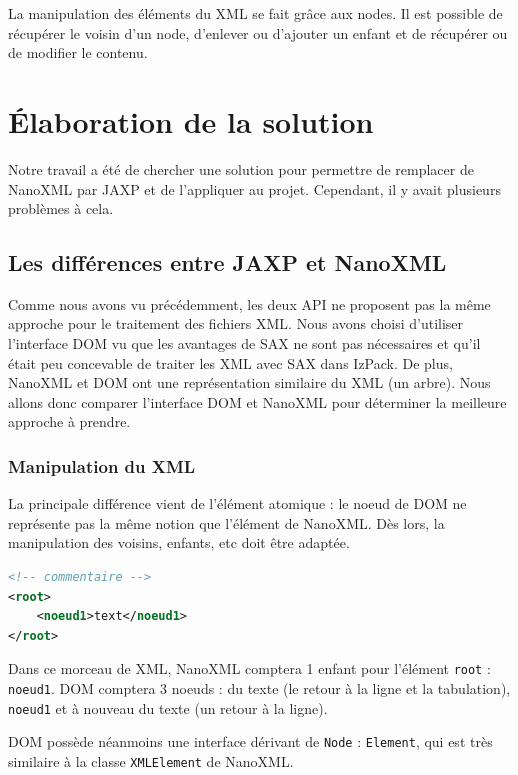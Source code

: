 La manipulation des éléments du XML se fait grâce aux nodes.
Il est possible de récupérer le voisin d'un node, d'enlever ou d'ajouter un enfant et de récupérer ou de modifier le contenu.
\section{Élaboration de la solution}
Notre travail a été de chercher une solution pour permettre de remplacer de NanoXML par JAXP et de l'appliquer au projet.
Cependant, il y avait plusieurs problèmes à cela.
\subsection{Les différences entre JAXP et NanoXML}
Comme nous avons vu précédemment, les deux API ne proposent pas la même approche pour le traitement des fichiers XML.
Nous avons choisi d'utiliser l'interface DOM vu que les avantages de SAX ne sont pas nécessaires et qu'il était peu concevable de traiter les XML avec SAX dans IzPack.
De plus, NanoXML et DOM ont une représentation similaire du XML (un arbre).
Nous allons donc comparer l'interface DOM et NanoXML pour déterminer la meilleure approche à prendre.
\subsubsection{Manipulation du XML}
La principale différence vient de l'élément atomique : le noeud de DOM ne représente pas la même notion que l'élément de NanoXML.
Dès lors, la manipulation des voisins, enfants, etc doit être adaptée.
\begin{lstlisting}[language=XML]
<!-- commentaire -->
<root>
	<noeud1>text</noeud1>
</root>
\end{lstlisting}
Dans ce morceau de XML, NanoXML comptera 1 enfant pour l'élément \verb|root| : \verb|noeud1|.
DOM comptera 3 noeuds : du texte (le retour à la ligne et la tabulation), \verb|noeud1| et à nouveau du texte (un retour à la ligne).

DOM possède néanmoins une interface dérivant de \verb|Node| : \verb|Element|, qui est très similaire à la classe \verb|XMLElement| de NanoXML.
